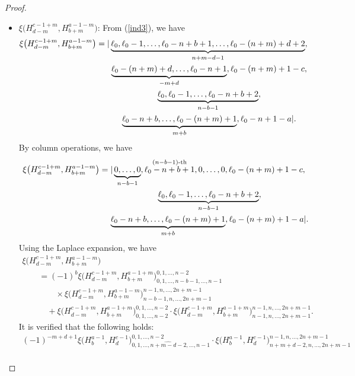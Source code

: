 \documentclass[10pt,a4paper]{amsart}
\numberwithin{equation}{section}
\begin{document}
\begin{proof}
\begin{itemize}
\item $\xi\bigl(H^{c-1+m}_{d-m}, H^{a-1-m}_{b+m}\bigr)$: From (\ref{ind3}), we have
\begin{gather*}
\xi\bigl(H^{c-1+m}_{d-m}, H^{a-1-m}_{b+m}\bigr)=|\underbrace{\ell_{0},\ell_{0}-1,\dots,\ell_0-n+b+1,\dots,\ell_{0}-(n+m)+d+2}_{n+m-d-1},\\
\hphantom{\xi\bigl(H^{c-1+m}_{d-m}, H^{a-1-m}_{b+m}\bigr)=|}{}
\underbrace{\ell_{0}-(n+m)+d,\dots,\ell_{0}-n+1}_{-m+d},\ell_{0}-(n+m)+1-c,\nonumber\\
\hphantom{\xi\bigl(H^{c-1+m}_{d-m}, H^{a-1-m}_{b+m}\bigr)=|}{}
\underbrace{\ell_{0},\ell_{0}-1,\dots,\ell_{0}-n+b+2}_{n-b-1},\nonumber\\
\hphantom{\xi\bigl(H^{c-1+m}_{d-m}, H^{a-1-m}_{b+m}\bigr)=|}{}
\underbrace{\ell_{0}-n+b,\dots,\ell_{0}-(n+m)+1}_{m+b},\ell_{0}-n+1-a|.
\end{gather*}
By column operations, we have
\begin{gather*}
\xi\bigl(H^{c-1+m}_{d-m}, H^{a-1-m}_{b+m}\bigr)=|\underbrace{0,\dots,0}_{n-b-1},\stackrel{(n-b-1)\text{-th}}{\ell_{0}-n+b+1},0, \dots,0,\ell_{0}-(n+m)+1-c,\nonumber\\
\hphantom{\xi\bigl(H^{c-1+m}_{d-m}, H^{a-1-m}_{b+m}\bigr)=|}{}
\underbrace{\ell_{0},\ell_{0}-1,\dots,\ell_{0}-n+b+2}_{n-b-1},\nonumber\\
\hphantom{\xi\bigl(H^{c-1+m}_{d-m}, H^{a-1-m}_{b+m}\bigr)=|}{}
\underbrace{\ell_{0}-n+b,\dots,\ell_{0}-(n+m)+1}_{m+b},\ell_{0}-(n+m)+1-a|\nonumber.
\end{gather*}
Using the Laplace expansion, we have
\begin{gather*}
\xi\bigl(H^{c-1+m}_{d-m}, H^{a-1-m}_{b+m}\bigr)\\
\qquad{}={(-1)}^{b}\xi\bigl(H^{c-1+m}_{d-m}, H^{a-1+m}_{b+m}\bigr)^{0,1,\dots,n-2}_{0,1,\dots,\widehat{n-b-1},\dots,n-1}\\
\qquad\qquad{}\times \xi\bigl(H^{c-1+m}_{d-m}, H^{a-1-m}_{b+m}\bigr)^{n-1,n,\dots,2n+m-1}_{n-b-1,n,\dots,2n+m-1}\\
\qquad\quad{}+\xi\bigl(H^{c-1+m}_{d-m}, H^{a-1+m}_{b+m}\bigr)^{0,1,\dots,n-2}_{0,1,\dots,n-2}\cdot\xi\bigl(H^{c-1+m}_{d-m}, H^{a-1+m}_{b+m}\bigr)^{n-1,n,\dots,2n+m-1}_{n-1,n,\dots,2n+m-1}.
\end{gather*}
It is verified that the following holds:
\begin{gather*}
{(-1)}^{-m+d+1}\xi\bigl(H^{a-1}_{b}, H^{c-1}_{d}\bigr)^{0,1,\dots,n-2}_{0,1,\dots,\widehat{n+m-d-2},\dots,n-1}\cdot\xi\bigl(H^{a-1}_{b}, H^{c-1}_{d}\bigr)^{n-1,n,\dots,2n+m-1}_{n+m+d-2,n,\dots,2n+m-1}\\

\end{gather*}
\end{itemize}
\end{proof}
\end{document}

